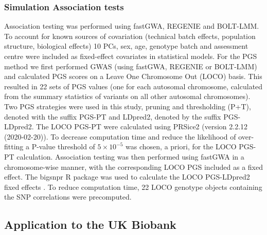 \documentclass[fleqn,10pt]{wlscirep}
\begin{document}
\subsubsection*{Simulation Association tests} 
Association testing was performed using fastGWA, REGENIE and BOLT-LMM. To 
account for known sources of covariation (technical batch effects, population structure, biological effects) 10 PCs, sex, age, genotype batch and assessment centre were included as fixed-effect covariates in statistical models. For the PGS method we first performed GWAS (using fastGWA, REGENIE or BOLT-LMM) and calculated PGS scores on a Leave One Chromosome Out (LOCO) basis. This resulted in 22 sets of PGS values (one for each autosomal chromosome, calculated from the summary statistics of variants on all other autosomal chromosomes). Two PGS strategies were used in this study, pruning and thresholding (P+T), denoted with the suffix PGS-PT and LDpred2, denoted by the suffix PGS-LDpred2. The LOCO PGS-PT were calculated using PRSice2 (version 2.2.12 (2020-02-20))\cite{choi2019prsice}. To decrease computation time and reduce the likelihood of over-fitting a P-value threshold of $5\times10^{-5}$ was chosen, a priori, for the LOCO PGS-PT calculation. Association testing was then performed using fastGWA in a chromosome-wise manner, with the corresponding LOCO PGS included as a fixed effect. The bigsnpr R package was used to calculate the LOCO PGS-LDpred2 fixed effects \cite{LDpred2}. To reduce computation time, 22 LOCO genotype objects containing the SNP correlations were precomputed.


\subsection*{Application to the UK Biobank} 
\end{document}
